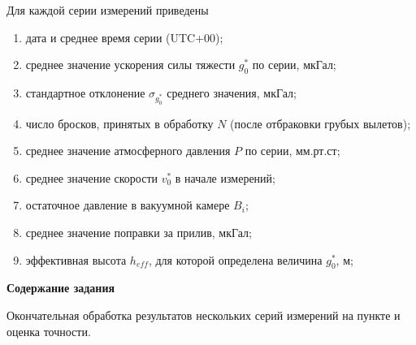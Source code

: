 \documentclass[12pt, a4paper]{article}
\theoremstyle{remark}
\begin{document}
Для каждой серии измерений приведены
\begin{enumerate}
    \item дата и среднее время серии (UTC+00);
    \item среднее значение ускорения силы тяжести $g^*_0$ по серии, мкГал;
    \item стандартное отклонение $\sigma_{g^*_0}$ среднего значения, мкГал;
    \item число бросков, принятых в обработку $N$ (после отбраковки грубых вылетов);
    \item среднее значение атмосферного давления $P$ по серии, мм.рт.ст;
    \item среднее значение скорости $v_0^*$ в начале измерений;
    \item остаточное давление в вакуумной камере $B_i$;
    \item среднее значение поправки за прилив, мкГал;
    \item эффективная высота $h_{eff}$, для которой определена величина $g^*_0$, м;
\end{enumerate}

\begin{center}
    \textbf{Содержание задания}
\end{center}
Окончательная обработка результатов нескольких серий измерений на пункте и оценка точности.
\end{document}
